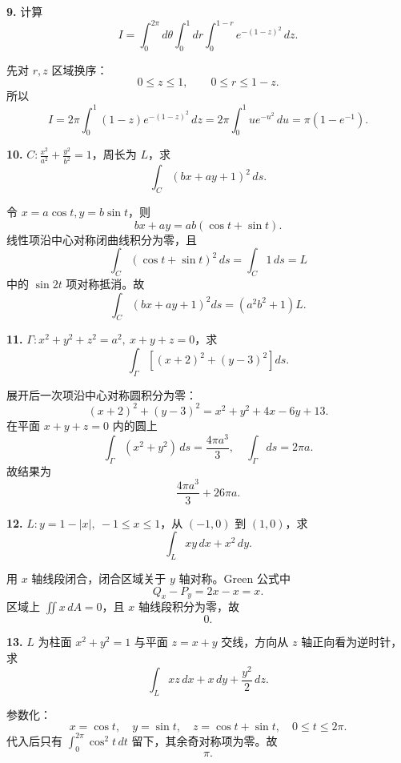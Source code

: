 \begin{problemblock}
\textbf{9.} 计算
\[
I=\int_0^{2\pi}d\theta\int_0^1dr\int_0^{1-r}e^{-(1-z)^2}\,dz.
\]
\end{problemblock}
\begin{solutionblock}
先对 \(r,z\) 区域换序：
\[
0\le z\le1,\qquad 0\le r\le1-z.
\]
所以
\[
I=2\pi\int_0^1(1-z)e^{-(1-z)^2}\,dz
=2\pi\int_0^1u e^{-u^2}\,du
=\boxed{\pi(1-e^{-1})}.
\]
\end{solutionblock}

\begin{problemblock}
\textbf{10.} \(C:\frac{x^2}{a^2}+\frac{y^2}{b^2}=1\)，周长为 \(L\)，求
\[
\int_C(bx+ay+1)^2\,ds.
\]
\end{problemblock}
\begin{solutionblock}
令 \(x=a\cos t,y=b\sin t\)，则
\[
bx+ay=ab(\cos t+\sin t).
\]
线性项沿中心对称闭曲线积分为零，且
\[
\int_C(\cos t+\sin t)^2\,ds=\int_C1\,ds=L
\]
中的 \(\sin2t\) 项对称抵消。故
\[
\boxed{\int_C(bx+ay+1)^2ds=(a^2b^2+1)L}.
\]
\end{solutionblock}

\begin{problemblock}
\textbf{11.} \(\Gamma:x^2+y^2+z^2=a^2,\ x+y+z=0\)，求
\[
\int_\Gamma\left[(x+2)^2+(y-3)^2\right]ds.
\]
\end{problemblock}
\begin{solutionblock}
展开后一次项沿中心对称圆积分为零：
\[
(x+2)^2+(y-3)^2=x^2+y^2+4x-6y+13.
\]
在平面 \(x+y+z=0\) 内的圆上
\[
\int_\Gamma (x^2+y^2)\,ds=\frac{4\pi a^3}{3},
\quad
\int_\Gamma ds=2\pi a.
\]
故结果为
\[
\boxed{\frac{4\pi a^3}{3}+26\pi a}.
\]
\end{solutionblock}

\begin{problemblock}
\textbf{12.} \(L:y=1-|x|,\ -1\le x\le1\)，从 \((-1,0)\) 到 \((1,0)\)，求
\[
\int_L xy\,dx+x^2\,dy.
\]
\end{problemblock}
\begin{solutionblock}
用 \(x\) 轴线段闭合，闭合区域关于 \(y\) 轴对称。Green 公式中
\[
Q_x-P_y=2x-x=x.
\]
区域上 \(\iint x\,dA=0\)，且 \(x\) 轴线段积分为零，故
\[
\boxed{0}.
\]
\end{solutionblock}

\begin{problemblock}
\textbf{13.} \(L\) 为柱面 \(x^2+y^2=1\) 与平面 \(z=x+y\) 交线，方向从 \(z\) 轴正向看为逆时针，求
\[
\int_L xz\,dx+x\,dy+\frac{y^2}{2}\,dz.
\]
\end{problemblock}
\begin{solutionblock}
参数化：
\[
x=\cos t,\quad y=\sin t,\quad z=\cos t+\sin t,\quad 0\le t\le2\pi.
\]
代入后只有 \(\int_0^{2\pi}\cos^2t\,dt\) 留下，其余奇对称项为零。故
\[
\boxed{\pi}.
\]
\end{solutionblock}

